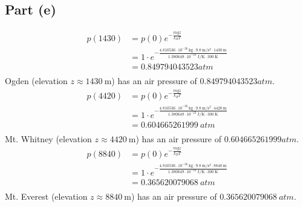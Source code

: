 \documentclass{article}
\begin{document}
\subsection*{Part (e)}
\begin{equation}
    \begin{split}
        p(1430) & = p(0)e^{-\frac{mgz}{k_BT}} \\
        & = 1 \cdot e^{-\frac{4.810536 \cdot 10^{-26}~\unit{\kilo\gram} \cdot 9.8~\unit{\meter\per\second\squared} \cdot 1430~\unit{\meter}}{1.380649 \cdot 10^{-23}~\unit{\joule\per\kelvin} \cdot 300~\unit{\kelvin}}} \\
        & = 0.849794043523 \unit{atm} \\
    \end{split}
\end{equation}
Ogden (elevation $z \approx 1430~\unit{\meter}$) has an air pressure of $0.849794043523 \unit{atm}$.
\begin{equation}
    \begin{split}
        p(4420) & = p(0)e^{-\frac{mgz}{k_BT}} \\
        & = 1 \cdot e^{-\frac{4.810536 \cdot 10^{-26}~\unit{\kilo\gram} \cdot 9.8~\unit{\meter\per\second\squared} \cdot 4420~\unit{\meter}}{1.380649 \cdot 10^{-23}~\unit{\joule\per\kelvin} \cdot 300~\unit{\kelvin}}} \\
        & = 0.604665261999~\unit{atm} \\
    \end{split}
\end{equation}
Mt. Whitney (elevation $z \approx 4420~\unit{\meter}$) has an air pressure of $0.604665261999 \unit{atm}$.
\begin{equation}
    \begin{split}
        p(8840) & = p(0)e^{-\frac{mgz}{k_BT}} \\
        & = 1 \cdot e^{-\frac{4.810536 \cdot 10^{-26}~\unit{\kilo\gram} \cdot 9.8~\unit{\meter\per\second\squared} \cdot 8840~\unit{\meter}}{1.380649 \cdot 10^{-23}~\unit{\joule\per\kelvin} \cdot 300~\unit{\kelvin}}} \\
        & = 0.365620079068~\unit{atm} \\
    \end{split}
\end{equation}
Mt. Everest (elevation $z \approx 8840~\unit{\meter}$) has an air pressure of $0.365620079068~\unit{atm}$.
\end{document}
